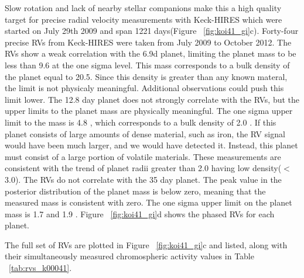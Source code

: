 \documentclass{emulateapj}
\begin{document}
Slow  rotation and  lack of nearby stellar companions make 
this a high quality  target for precise radial velocity 
measurements with Keck-HIRES which were 
started on July 29th 2009 and span 1221 days(Figure ~\ref{fig:koi41_gi}c).
 Forty-four precise RVs from Keck-HIRES were taken from July 2009 to
 October 2012. The RVs show a weak
 correlation with the 6.9d planet, limiting the planet mass to be less
 than 9.6 \mearth at the one sigma level. This mass corresponds to a bulk
 density of the planet equal to 20.5\gcc. Since this density is greater than any
 known materal, the limit is not physicaly meaningful. Additional observations
 could push this limit lower.   The 12.8 day planet does
 not strongly correlate  with the RVs, but the
 upper limits to the planet mass are physically meaningful. The one sigma upper
 limit to the mass is 4.8 \mearth, which corresponds to a bulk density
 of 2.0 \gcc. If this planet consists of large amounts of dense
 material, such as iron, the RV signal would have been much larger,
 and we would have detected it. Instead, this planet must consist of a large portion
 of volatile materials.  These measurements are consistent
 with the trend of planet radii greater than 2.0 \rearth having low
 density($<$ 3.0\gcc).  The RVs do not correlate with the 35 day planet. The peak
 value in the posterior distribution of the planet mass is below zero,
 meaning that the measured mass is consistent with zero. The one sigma
 upper limit on the planet mass is 1.7 \mearth and 1.9 \gcc. 
 Figure ~\ref{fig:koi41_gi}d shows the phased RVs for each planet. 

 The full set of RVs are plotted in  Figure ~\ref{fig:koi41_gi}c 
 and listed, along with their \rphk simultaneously measured 
 chromospheric activity values in Table ~\ref{tab:rvs_k00041}.




%
%
%
\end{document}
